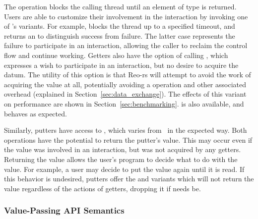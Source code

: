 The  operation blocks the calling thread until an element of type  is returned. Users are able to customize their involvement in the interaction by invoking one of 's variants. For example,  blocks the thread up to a specified timeout, and returns an  to distinguish success from failure. The latter case represents the failure to participate in an interaction, allowing the caller to reclaim the control flow and continue working. Getters also have the option of calling , which expresses a wish to participate in an interaction, but no desire to acquire the datum. The utility of this option is that Reo-rs will attempt to avoid the work of acquiring the value at all, potentially avoiding a  operation and other associated overhead (explained in Section~\ref{sec:data_exchange}). The effects of this variant on performance are shown in Section~\ref{sec:benchmarking}.  is also available, and behaves as expected.

Similarly, putters have access to , which varies from~ in the expected way. Both operations have the potential to return the putter's value. This may occur even if the value was involved in an interaction, but was not acquired by any getters. Returning the value allows the user's program to decide what to do with the value. For example, a user may decide to put the value again until it is read. If this behavior is undesired, putters offer the  and  variants which will not return the value regardless of the actions of getters, dropping it if needs be.

\subsubsection{Value-Passing API Semantics}



